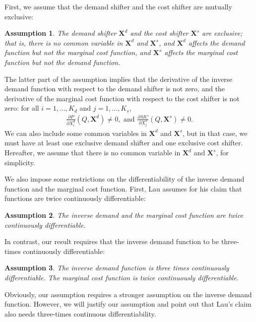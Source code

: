 \documentclass[11pt, a4paper]{article}
\newtheorem{assumption}{Assumption}
\begin{document}
First, we assume that the demand shifter and the cost shifter are mutually exclusive:
\begin{assumption}\label{assumption:exclusive_shifters}
    The demand shifter $\bm{X}^{d}$ and the cost shifter $\bm{X}^{s}$ are exclusive; that is, there is no common variable in $\bm{X}^{d}$ and $\bm{X}^{s}$, and $\bm{X}^{d}$ affects the demand function but not the marginal cost function, and $\bm{X}^{s}$ affects the marginal cost function but not the demand function.
\end{assumption}
The latter part of the assumption implies that the derivative of the inverse demand function with respect to the demand shifter is not zero, and the derivative of the marginal cost function with respect to the cost shifter is not zero: for all $i = 1, \ldots, K_d$ and $j = 1, \ldots, K_s$,
\begin{align}
    \frac{\partial P}{\partial X^{d}_i}(Q, \bm{X}^{d}) \ne 0, \text{ and } \frac{\partial MC}{\partial X^{s}_{j}}(Q, \bm{X}^{s}) \ne 0.
\end{align}
We can also include some common variables in $\bm{X}^{d}$ and $\bm{X}^{s}$, but in that case, we must have at least one exclusive demand shifter and one exclusive cost shifter.
Hereafter, we assume that there is no common variable in $\bm{X}^{d}$ and $\bm{X}^{s}$, for simplicity.

We also impose some restrictions on the differentiability of the inverse demand function and the marginal cost function.
First, Lau assumes for his claim that functions are twice continuously differentiable:
\begin{assumption}\label{assumption:twice_differentiable}
    The inverse demand and the marginal cost function are twice continuously differentiable.
\end{assumption}
In contrast, our result requires that the inverse demand function to be three-times continuously differentiable:
\begin{assumption}\label{assumption:three_times_differentiable}
    The inverse demand function is three times continuously differentiable.
    The marginal cost function is twice continuously differentiable.
\end{assumption}
Obviously, our assumption requires a stronger assumption on the inverse demand function.
However, we will justify our assumption and point out that Lau's claim also needs three-times continuous differentiability.
\end{document}
